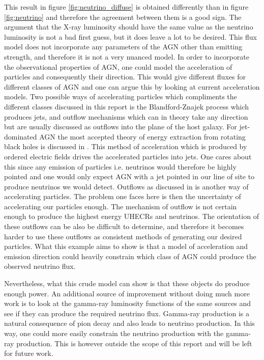 This result in figure \ref*{fig:neutrino_diffuse} is obtained differently than in figure \ref*{fig:neutrino} and therefore the agreement between them is a good sign. The argument that the X-ray luminosity should have the same value as the neutrino luminosity is not a bad first guess, but it does leave a lot to be desired. 
This flux model does not incorporate any parameters of the AGN other than emitting strength, and therefore it is not a very nuanced model. 
In order to incorporate the observational properties of AGN, one could model the acceleration of particles and consequently their direction. This would give different fluxes for different classes of AGN and one can argue this by looking at current acceleration models. 
Two possible ways of accelerating particles which compliments the different classes discussed in this report is the Blandford-Znajek process which produces jets, and outflow mechanisms which can in theory take any direction but are usually discussed as outflows into the plane of the host galaxy.
For jet-dominated AGN the most accepted theory of energy extraction from rotating black holes is discussed in \cite{Blandford_1977}. This method of acceleration which is produced by ordered electric fields drives the accelerated particles into jets. One cares about this since any emission of particles i.e. neutrinos would therefore be highly pointed and one would only expect 
AGN with a jet pointed in our line of site to produce neutrinos we would detect. 
Outflows as discussed in \cite{Laha_2021} is another way of accelerating particles. The problem one faces here is 
then the uncertainty of accelerating our particles enough. The mechanism of outflow is not certain enough to produce the highest energy UHECRs and neutrinos. The orientation of these outflows can be also be difficult to determine, and therefore it becomes harder to use these outflows as consistent methods of generating our desired particles.
What this example aims to show is that a model of acceleration and emission direction could heavily constrain which class of AGN could produce the observed neutrino flux.

Nevertheless, what this crude model can show is that these objects do produce enough power. An additional source of improvement without doing much more work is to look at the gamma-ray luminosity functions of the same sources and see if they can produce the required neutrino flux. Gamma-ray production is a natural consequence of pion decay and also leads to neutrino production.
In this way, one could more easily constrain the neutrino production with the gamma-ray production. 
This is however outside the scope of this report and will be left for future work. 




